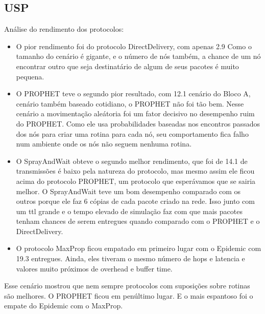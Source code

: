 \documentclass[conference]{IEEEtran}
\begin{document}
\subsection{USP}
  	Análise do rendimento dos protocolos:
  	\begin{itemize}
  	  \item O pior rendimento foi do protocolo DirectDelivery, com apenas 2.9%
			Como o tamanho do cenário é gigante, e o número de nós também, a chance de um nó encontrar
			outro que seja destinatário de algum de seus pacotes é muito pequena. 
			\item O PROPHET teve o segundo pior resultado, com 12.1%
			cenário do Bloco A, cenário também baseado cotidiano, o PROPHET não foi tão bem. Nesse cenário
			a movimentação aleátoria foi um fator decisivo no desempenho ruim do PROPHET. Como ele usa
			probabilidades baseadas nos encontros passados dos nós para criar uma rotina para cada nó,
			seu comportamento fica falho num ambiente onde os nós não seguem nenhuma rotina.
			\item O SprayAndWait obteve o segundo melhor rendimento, que foi de 14.1%
			de transmissões é baixo pela natureza do protocolo, mas mesmo assim ele ficou acima do protocolo 
			PROPHET, um protocolo que esperávamos que se sairia melhor. O SprayAndWait teve um bom desempenho
			comparado com os outros porque ele faz 6 cópias de cada pacote criado na rede. Isso junto com um
			ttl grande e o tempo elevado de simulação faz com que mais pacotes tenham chances de serem
			entregues quando comparado com o PROPHET e o DirectDelivery.
			\item O protocolo MaxProp ficou empatado em primeiro lugar com o Epidemic com 19.3%
			entregues. Ainda, eles tiveram o mesmo número de hops e latencia e valores muito próximos
			de overhead e buffer time. 
  	\end{itemize}
  
  Esse cenário mostrou que nem sempre protocolos com suposições sobre rotinas são melhores. O PROPHET
ficou em penúltimo lugar. E o mais espantoso foi o empate do Epidemic com o MaxProp.			
\end{document}
